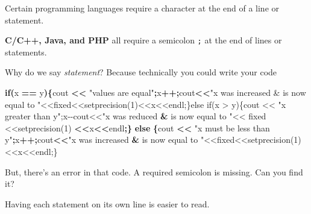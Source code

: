 \documentclass[
]{book}
\newenvironment{Shaded}{\begin{snugshade}}{\end{snugshade}}
\newcommand{\ControlFlowTok}[1]{\textcolor[rgb]{0.13,0.29,0.53}{\textbf{#1}}}
\newcommand{\NormalTok}[1]{#1}
\newcommand{\OperatorTok}[1]{\textcolor[rgb]{0.81,0.36,0.00}{\textbf{#1}}}
\newcommand{\StringTok}[1]{\textcolor[rgb]{0.31,0.60,0.02}{#1}}
\begin{document}
Certain programming languages require a character at the end of a line or statement.

\textbf{C/C++, Java, and PHP} all require a semicolon \texttt{;} at the end of lines or statements.

Why do we say \emph{statement}? Because technically you could write your code

\begin{Shaded}
\begin{Highlighting}[]
\ControlFlowTok{if}\OperatorTok{(}\NormalTok{x }\OperatorTok{==}\NormalTok{ y}\OperatorTok{)\{}\NormalTok{cout }\OperatorTok{\textless{}\textless{}} \StringTok{"values are equal"}\OperatorTok{;}\NormalTok{x}\OperatorTok{++;}\NormalTok{cout}\OperatorTok{\textless{}\textless{}}\StringTok{"x was increased \& is now }
\NormalTok{equal to }\StringTok{"\textless{}\textless{}fixed\textless{}\textless{}setprecision(1)\textless{}\textless{}x\textless{}\textless{}endl;\}else if(x \textgreater{} y)\{cout \textless{}\textless{} "}\NormalTok{x greater }
\NormalTok{than y}\StringTok{";x{-}{-}cout\textless{}\textless{}"}\NormalTok{x was reduced }\OperatorTok{\&}\NormalTok{ is now equal to }\StringTok{"\textless{}\textless{} fixed \textless{}\textless{}setprecision(1)}
\OperatorTok{\textless{}\textless{}}\NormalTok{x}\OperatorTok{\textless{}\textless{}}\NormalTok{endl}\OperatorTok{;\}} \ControlFlowTok{else} \OperatorTok{\{}\NormalTok{cout }\OperatorTok{\textless{}\textless{}} \StringTok{"x must be less than y"}\OperatorTok{;}\NormalTok{x}\OperatorTok{++;}\NormalTok{cout}\OperatorTok{\textless{}\textless{}}\StringTok{"x was increased }
\OperatorTok{\&}\NormalTok{ is now equal to }\StringTok{"\textless{}\textless{}fixed\textless{}\textless{}setprecision(1)\textless{}\textless{}x\textless{}\textless{}endl;\}}
\end{Highlighting}
\end{Shaded}

But, there's an error in that code. A required semicolon is missing.
Can you find it?

Having each statement on its own line is easier to read.
\end{document}
